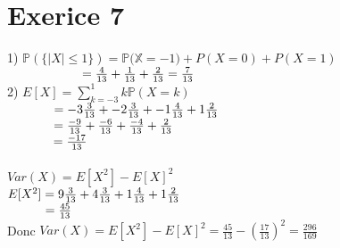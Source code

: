 \documentclass{article}
\author{Frederic Becerril}
\newcommand\tab[1][1cm]{\hspace*{#1}}
\begin{document}
\part*{Exerice 7}

1) $\mathbb{P}(\{|X| \leq 1\}) = \mathbb{P(X} = -1) + P(X = 0) + P(X = 1)$\\
$\tab[2.1cm] = \frac{4}{13} + \frac{1}{13} + \frac{2}{13} = \frac{7}{13}$\\
2) $E[X] = \sum_{k = -3}^1 k \mathbb{P}(X = k)$\\
$\tab[1.3cm] = -3 \frac{3}{13} + -2 \frac{3}{13} + -1 \frac{4}{13} + 1 \frac{2}{13}$\vspace{3mm}\\
$\tab[1.3cm] = \frac{-9}{13} + \frac{-6}{13} + \frac{-4}{13} + \frac{2}{13}$\vspace{3mm}\\
$\tab[1.3cm] = \frac{-17}{13}$\\
\\
$Var(X) = E[X^2] - E[X]^2$\\
$E[X^2] = 9\frac{3}{13} + 4 \frac{3}{13} + 1 \frac{4}{13} + 1 \frac{2}{13} \vspace{3mm}$\\
$\tab[1.05cm] = \frac{45}{13}$\\
Donc $Var(X) = E[X^2] - E[X]^2 = \frac{45}{13} - \left(\frac{17}{13}\right)^2 = \frac{296}{169}$\\
\end{document}
